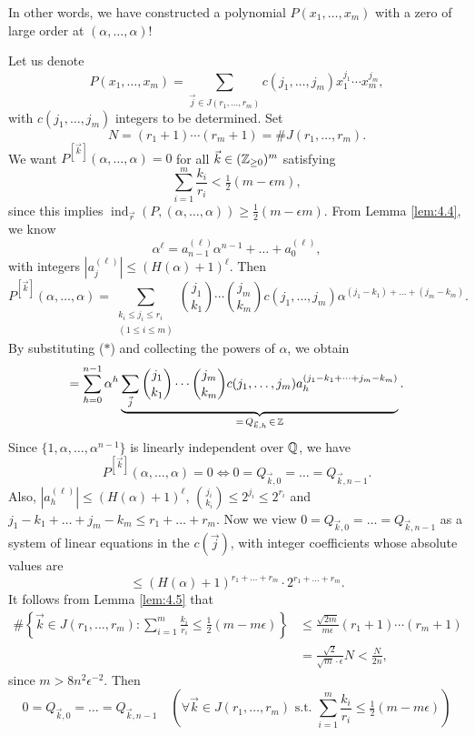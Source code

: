 \documentclass{Vorlesungstemplate_English} %
\begin{document}
\noindent In other words, we have constructed a polynomial $P(x_1, \dots, x_m)$ with a zero of large order at $(\alpha, \dots, \alpha)$!
\begin{pf}
  Let us denote
  \[ P(x_1, \dots, x_m) = \sum_{\vec j \in J(r_1, \dots, r_m)}c(j_1, \dots, j_m)x_1^{j_1}\cdots x_m^{j_m},\]
  with $c(j_1, \dots, j_m)$ integers to be determined. Set
  \[ N = (r_1 + 1)\cdots(r_m+1) = \#J(r_1, \dots, r_m).\]
  We want $P^{[\vec k]}(\alpha, \dots, \alpha) = 0$ for all $\vec k \in (\mathbb{Z}_{\geq 0})^m$ satisfying
  \[ \sum_{i=1}^m\frac{k_i}{r_i} < \tfrac{1}{2}(m-\epsilon m),\]
  since this implies $\operatorname{ind}_{\vec r}(P, (\alpha, \dots, \alpha)) \geq \tfrac{1}{2}(m-\epsilon m)$. From Lemma \ref{lem:4.4}, we know
  \[ \alpha^{\ell} = a_{n-1}^{(\ell)}\alpha^{n-1} + \dots + a_0^{(\ell)}, \tag{$*$}\]
  with integers $|a_j^{(\ell)}| \leq (H(\alpha)+1)^{\ell}$. Then
  \[ P^{[\vec k]}(\alpha, \dots, \alpha) = \sum_{\substack{k_i \leq j_i \leq r_i \\ (1 \leq i \leq m)}}\binom{j_1}{k_1}\cdots\binom{j_m}{k_m}c(j_1, \dots, j_m)\alpha^{(j_1-k_1) + \dots + (j_m-k_m)}.\]
  By substituting ($*$) and collecting the powers of $\alpha$, we obtain
  \[ = \sum_{h=0}^{n-1}\alpha^h\underbrace{\sum_{\vec j}\binom{j_1}{k_1}\cdots\binom{j_m}{k_m}c(j_1, \dots, j_m)a_h^{(j_1-k_1+\dots+j_m-k_m)}}_{=\, Q_{\vec k, h} \,\in\, \mathbb{Z}}.\]
  Since $\{ 1, \alpha, \dots, \alpha^{n-1}\}$ is linearly independent over $\mathbb{Q}$, we have
  \[ P^{[\vec k]}(\alpha, \dots, \alpha) = 0 \iff 0 = Q_{\vec k, 0} = \dots = Q_{\vec k, n-1}.\]
  Also, $|a_h^{(\ell)}| \leq (H(\alpha)+1)^{\ell}$, $\binom{j_i}{k_i} \leq 2^{j_i} \leq 2^{r_i}$ and $j_1 - k_1 + \dots + j_m - k_m \leq r_1 + \dots + r_m$. Now we view $0 = Q_{\vec k, 0} = \dots = Q_{\vec k, n-1}$ as a system of linear equations in the $c(\vec j)$, with integer coefficients whose absolute values are
  \[ \leq (H(\alpha)+1)^{r_1 + \dots + r_m}\cdot 2^{r_1 + \dots + r_m}.\]
  It follows from Lemma \ref{lem:4.5} that
  \begin{align*}
    \#\left\{ \vec k \in J(r_1, \dots, r_m): \sum_{i=1}^m\frac{k_i}{r_i} \leq \tfrac{1}{2}(m-m\epsilon)\right\} &\leq \frac{\sqrt{2m}}{m\epsilon}(r_1+1)\cdots(r_m+1) \\
    &= \frac{\sqrt 2}{\sqrt m \cdot \epsilon}N < \frac{N}{2n},
  \end{align*}
  since $m > 8n^2\epsilon^{-2}$. Then
  \[ 0 = Q_{\vec k, 0} = \dots = Q_{\vec k, n-1} \quad \left(\forall \vec k \in J(r_1, \dots, r_m) \text{ s.t. } \sum_{i=1}^m\frac{k_i}{r_i} \leq \tfrac{1}{2}(m-m\epsilon)\right)\]

\end{pf}
\end{document}
